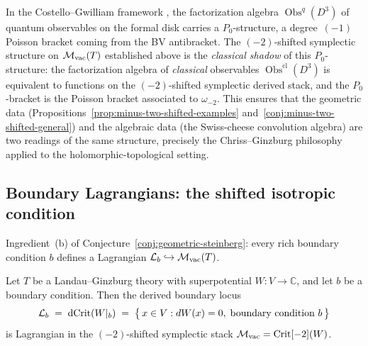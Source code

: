 \begin{remark}
\label{rem:CG-factorization-shifted}
In the Costello--Gwilliam framework \cite{CG17a,CG17b}, the
factorization algebra $\operatorname{Obs}^q(D^3)$ of quantum
observables on the formal disk carries a $P_0$-structure, a
degree~$(-1)$ Poisson bracket coming from the BV antibracket. The
$(-2)$-shifted symplectic structure on $\mathcal M_{\mathrm{vac}}(T)$
established above is the \emph{classical shadow} of this
$P_0$-structure: the factorization algebra of \emph{classical}
observables $\operatorname{Obs}^{\mathrm{cl}}(D^3)$ is equivalent to
functions on the $(-2)$-shifted symplectic derived stack, and the
$P_0$-bracket is the Poisson bracket associated to $\omega_{-2}$.
This ensures that the geometric data
(Propositions~\ref{prop:minus-two-shifted-examples}
and~\ref{conj:minus-two-shifted-general}) and the algebraic data
(the Swiss-cheese convolution algebra) are two readings of the same
structure, precisely the Chriss--Ginzburg philosophy applied to the
holomorphic-topological setting.
\end{remark}

\subsection{Boundary Lagrangians: the shifted isotropic condition}
\label{ssec:boundary-lagrangians}

Ingredient~(b) of Conjecture~\ref{conj:geometric-steinberg}:
every rich boundary condition $b$ defines a Lagrangian
$\mathcal L_b \hookrightarrow \mathcal M_{\mathrm{vac}}(T)$.

\begin{proposition}
\label{prop:lagrangian-lg}
\ClaimStatusProvedHere
Let $T$ be a Landau--Ginzburg theory with superpotential
$W \colon V \to \mathbb{C}$, and let $b$ be a boundary condition.
Then the derived boundary locus
\[
 \mathcal L_b \;=\; \operatorname{dCrit}(W|_b)
 \;=\; \bigl\{\, x \in V : dW(x) = 0,\;\text{boundary condition } b \,\bigr\}
\]
is Lagrangian in the $(-2)$-shifted symplectic stack
$\mathcal M_{\mathrm{vac}} = \operatorname{Crit}[-2](W)$.
\end{proposition}

